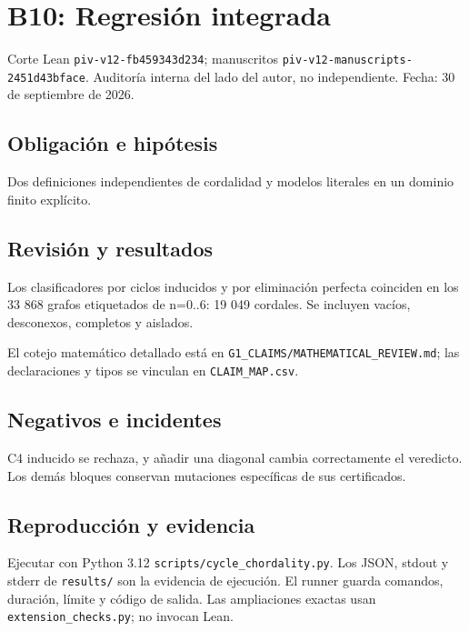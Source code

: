 \section{B10: Regresión integrada}\label{b10-regresiuxf3n-integrada}

Corte Lean \texttt{piv-v12-fb459343d234}; manuscritos
\texttt{piv-v12-manuscripts-2451d43bface}. Auditoría interna del lado
del autor, no independiente. Fecha: 30 de septiembre de 2026.

\subsection{Obligación e hipótesis}\label{obligaciuxf3n-e-hipuxf3tesis}

Dos definiciones independientes de cordalidad y modelos literales en un
dominio finito explícito.

\subsection{Revisión y resultados}\label{revisiuxf3n-y-resultados}

Los clasificadores por ciclos inducidos y por eliminación perfecta
coinciden en los 33 868 grafos etiquetados de n=0..6: 19 049 cordales.
Se incluyen vacíos, desconexos, completos y aislados.

El cotejo matemático detallado está en
\texttt{G1\_CLAIMS/MATHEMATICAL\_REVIEW.md}; las declaraciones y tipos
se vinculan en \texttt{CLAIM\_MAP.csv}.

\subsection{Negativos e incidentes}\label{negativos-e-incidentes}

C4 inducido se rechaza, y añadir una diagonal cambia correctamente el
veredicto. Los demás bloques conservan mutaciones específicas de sus
certificados.

\subsection{Reproducción y evidencia}\label{reproducciuxf3n-y-evidencia}

Ejecutar con Python 3.12 \texttt{scripts/cycle\_chordality.py}. Los
JSON, stdout y stderr de \texttt{results/} son la evidencia de
ejecución. El runner guarda comandos, duración, límite y código de
salida. Las ampliaciones exactas usan \texttt{extension\_checks.py}; no
invocan Lean.

